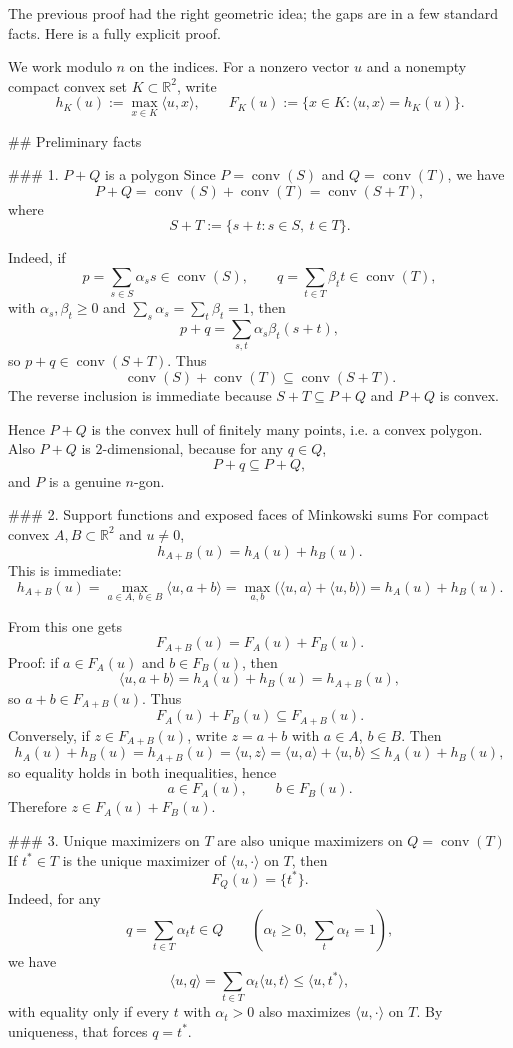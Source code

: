 The previous proof had the right geometric idea; the gaps are in a few standard facts. Here is a fully explicit proof.

We work modulo \(n\) on the indices. For a nonzero vector \(u\) and a nonempty compact convex set \(K\subset \mathbb{R}^2\), write
\[
h_K(u):=\max_{x\in K}\langle u,x\rangle,
\qquad
F_K(u):=\{x\in K:\langle u,x\rangle=h_K(u)\}.
\]

## Preliminary facts

### 1. \(P+Q\) is a polygon
Since \(P=\operatorname{conv}(S)\) and \(Q=\operatorname{conv}(T)\), we have
\[
P+Q=\operatorname{conv}(S)+\operatorname{conv}(T)=\operatorname{conv}(S+T),
\]
where
\[
S+T:=\{s+t:s\in S,\ t\in T\}.
\]

Indeed, if
\[
p=\sum_{s\in S}\alpha_s s\in \operatorname{conv}(S),
\qquad
q=\sum_{t\in T}\beta_t t\in \operatorname{conv}(T),
\]
with \(\alpha_s,\beta_t\ge 0\) and \(\sum_s\alpha_s=\sum_t\beta_t=1\), then
\[
p+q=\sum_{s,t}\alpha_s\beta_t(s+t),
\]
so \(p+q\in \operatorname{conv}(S+T)\). Thus
\[
\operatorname{conv}(S)+\operatorname{conv}(T)\subseteq \operatorname{conv}(S+T).
\]
The reverse inclusion is immediate because \(S+T\subseteq P+Q\) and \(P+Q\) is convex.

Hence \(P+Q\) is the convex hull of finitely many points, i.e. a convex polygon. Also \(P+Q\) is \(2\)-dimensional, because for any \(q\in Q\),
\[
P+q\subseteq P+Q,
\]
and \(P\) is a genuine \(n\)-gon.

### 2. Support functions and exposed faces of Minkowski sums
For compact convex \(A,B\subset\mathbb{R}^2\) and \(u\neq 0\),
\[
h_{A+B}(u)=h_A(u)+h_B(u).
\]
This is immediate:
\[
h_{A+B}(u)
=\max_{a\in A,\ b\in B}\langle u,a+b\rangle
=\max_{a,b}\bigl(\langle u,a\rangle+\langle u,b\rangle\bigr)
=h_A(u)+h_B(u).
\]

From this one gets
\[
F_{A+B}(u)=F_A(u)+F_B(u).
\]
Proof: if \(a\in F_A(u)\) and \(b\in F_B(u)\), then
\[
\langle u,a+b\rangle=h_A(u)+h_B(u)=h_{A+B}(u),
\]
so \(a+b\in F_{A+B}(u)\). Thus
\[
F_A(u)+F_B(u)\subseteq F_{A+B}(u).
\]
Conversely, if \(z\in F_{A+B}(u)\), write \(z=a+b\) with \(a\in A\), \(b\in B\). Then
\[
h_A(u)+h_B(u)=h_{A+B}(u)=\langle u,z\rangle
=\langle u,a\rangle+\langle u,b\rangle\le h_A(u)+h_B(u),
\]
so equality holds in both inequalities, hence
\[
a\in F_A(u),\qquad b\in F_B(u).
\]
Therefore \(z\in F_A(u)+F_B(u)\).

### 3. Unique maximizers on \(T\) are also unique maximizers on \(Q=\operatorname{conv}(T)\)
If \(t^\ast\in T\) is the unique maximizer of \(\langle u,\cdot\rangle\) on \(T\), then
\[
F_Q(u)=\{t^\ast\}.
\]
Indeed, for any
\[
q=\sum_{t\in T}\alpha_t t\in Q
\qquad
(\alpha_t\ge 0,\ \sum_t\alpha_t=1),
\]
we have
\[
\langle u,q\rangle=\sum_{t\in T}\alpha_t\langle u,t\rangle\le \langle u,t^\ast\rangle,
\]
with equality only if every \(t\) with \(\alpha_t>0\) also maximizes \(\langle u,\cdot\rangle\) on \(T\). By uniqueness, that forces \(q=t^\ast\).

